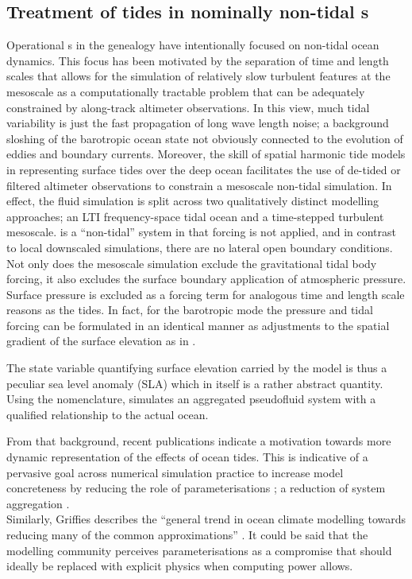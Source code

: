\subsection{Treatment of tides in nominally non-tidal \OGCM{}s}
\label{sec:tides_ogcm}
Operational \OGCM{}s in the \GODAE{} genealogy have intentionally focused on non-tidal ocean dynamics. This focus has been motivated by the separation of time and length scales that allows for the simulation of relatively slow turbulent features at the mesoscale as a computationally tractable problem that can be adequately constrained by along-track altimeter observations.
In this view, much tidal variability is just the fast propagation of long wave length noise; a background sloshing of the barotropic ocean state not obviously connected to the evolution of eddies and boundary currents.
Moreover, the skill of spatial harmonic tide models in representing surface tides over the deep ocean facilitates the use of de-tided or filtered altimeter observations to constrain a mesoscale non-tidal simulation. In effect, the fluid simulation is split across two qualitatively distinct modelling approaches; an LTI frequency-space tidal ocean and a time-stepped turbulent mesoscale.  
\BL{} is a ``non-tidal'' system in that \ATGP{} forcing is not applied, and in contrast to local downscaled simulations, there are no lateral open boundary conditions. Not only does the mesoscale simulation exclude the gravitational tidal body forcing, it also excludes the surface boundary application of atmospheric pressure.   
Surface pressure is excluded as a forcing term for analogous time and length scale reasons as the tides.  In fact, for the barotropic mode the pressure and tidal forcing can be formulated in an identical manner as adjustments to the spatial gradient of the surface elevation as in \citet[equation 9.9.5]{gill1982atmosphere}.

The state variable quantifying surface elevation carried by the model is thus a peculiar sea level anomaly (SLA) which in itself is a rather abstract quantity. 
Using the \citet{Stevens:2001kb} nomenclature, \BL{} simulates an aggregated pseudofluid system with a qualified relationship to the actual ocean.


From that background, recent publications indicate a motivation towards more dynamic representation of the effects of ocean tides.   This is indicative of a pervasive goal across numerical simulation practice to increase model concreteness by reducing the role of parameterisations \citep[section 5.3]{Petersen:2012tr}; a reduction of system aggregation \citep{Stevens:2001kb}.\\
Similarly, Griffies describes the ``general trend in ocean climate modelling towards reducing many of the common approximations'' \citep[pp20] {Griffies:2004vs}.   It could be said that the modelling community perceives parameterisations as a compromise that should ideally be replaced with explicit physics when computing power allows.


